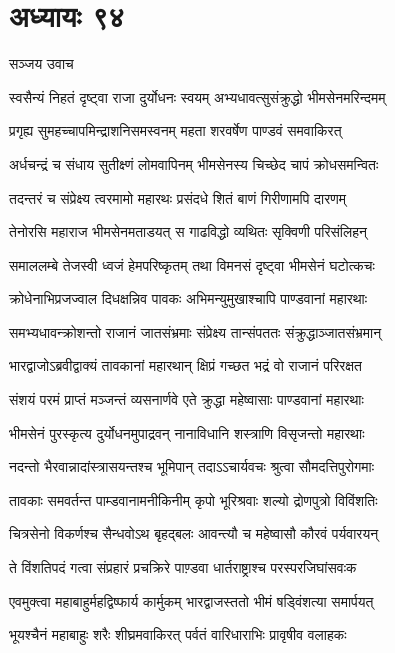 \chapter{अध्यायः ९४}
\twolineshloka
{सञ्जय उवाच}
{}


\twolineshloka
{स्वसैन्यं निहतं दृष्ट्वा राजा दुर्योधनः स्वयम्}
{अभ्यधावत्सुसंक्रुद्धो भीमसेनमरिन्दमम्}


\twolineshloka
{प्रगृह्य सुमहच्चापमिन्द्राशनिसमस्वनम्}
{महता शरवर्षेण पाण्डवं समवाकिरत्}


\twolineshloka
{अर्धचन्द्रं च संधाय सुतीक्ष्णं लोमवापिनम्}
{भीमसेनस्य चिच्छेद चापं क्रोधसमन्वितः}


\twolineshloka
{तदन्तरं च संप्रेक्ष्य त्वरमामो महारथः}
{प्रसंदधे शितं बाणं गिरीणामपि दारणम्}


\twolineshloka
{तेनोरसि महाराज भीमसेनमताडयत्}
{स गाढविद्धो व्यथितः सृक्विणी परिसंलिहन्}


\twolineshloka
{समाललम्बे तेजस्वी ध्वजं हेमपरिष्कृतम्}
{तथा विमनसं दृष्ट्वा भीमसेनं घटोत्कचः}


\twolineshloka
{क्रोधेनाभिप्रजज्वाल दिधक्षन्निव पावकः}
{अभिमन्युमुखाश्चापि पाण्डवानां महारथाः}


\twolineshloka
{समभ्यधावन्क्रोशन्तो राजानं जातसंभ्रमाः}
{संप्रेक्ष्य तान्संपततः संक्रुद्धाञ्जातसंभ्रमान्}


\twolineshloka
{भारद्वाजोऽब्रवीद्वाक्यं तावकानां महारथान्}
{क्षिप्रं गच्छत भद्रं वो राजानं परिरक्षत}


\twolineshloka
{संशयं परमं प्राप्तं मञ्जन्तं व्यसनार्णवे}
{एते क्रुद्धा महेष्वासाः पाण्डवानां महारथाः}


\twolineshloka
{भीमसेनं पुरस्कृत्य दुर्योधनमुपाद्रवन्}
{नानाविधानि शस्त्राणि विसृजन्तो महारथाः}


\twolineshloka
{नदन्तो भैरवान्नादांस्त्रासयन्तश्च भूमिपान्}
{तदाऽऽचार्यवचः श्रुत्वा सौमदत्तिपुरोगमाः}


\twolineshloka
{तावकाः समवर्तन्त पाम्डवानामनीकिनीम्}
{कृपो भूरिश्रवाः शल्यो द्रोणपुत्रो विविंशतिः}


\twolineshloka
{चित्रसेनो विकर्णश्च सैन्धवोऽथ बृहद्बलः}
{आवन्त्यौ च महेष्वासौ कौरवं पर्यवारयन्}


\twolineshloka
{ते विंशतिपदं गत्वा संप्रहारं प्रचक्रिरे}
{पाण़्डवा धार्तराष्ट्राश्च परस्परजिघांसवःक}


\twolineshloka
{एवमुक्त्वा महाबाहुर्महद्विष्फार्य कार्मुकम्}
{भारद्वाजस्ततो भीमं षड्विंशत्या समार्पयत्}


\twolineshloka
{भूयश्चैनं महाबाहुः शरैः शीघ्रमवाकिरत्}
{पर्वतं वारिधाराभिः प्रावृषीव वलाहकः}


